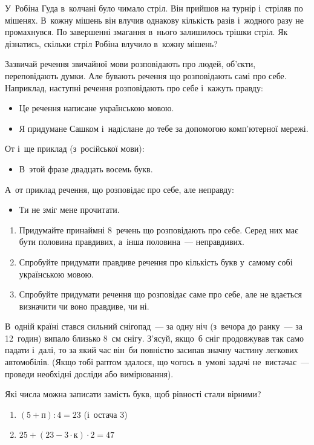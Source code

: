 \problem
У~Робіна Гуда в~колчані було чимало стріл.
Він прийшов на турнір і~стріляв по мішенях.
В~кожну мішень він влучив однакову кількість разів
і~жодного разу не промахнувся.
По завершенні змагання в~нього залишилось трішки стріл.
Як дізнатись, скільки стріл Робіна влучило в~кожну мішень?


\problem
Зазвичай речення звичайної мови розповідають про людей, об'єкти,
переповідають думки.
Але бувають речення що розповідають самі про себе.
Наприклад, наступні речення розповідають про себе і~кажуть правду:
\begin{itemize}
    \item Це речення написане українською мовою.
    \item Я придумане Сашком і~надіслане до тебе
    за допомогою комп’ютерної мережі.
\end{itemize}
От і~ще приклад (з~російської мови):
\begin{itemize}
    \item В~этой фразе двадцать восемь букв.
\end{itemize}
А~от приклад речення, що розповідає про себе, але неправду:
\begin{itemize}
    \item Ти не зміг мене прочитати.
\end{itemize}

\begin{enumerate}
    \item Придумайте принаймні 8~речень що розповідають про себе.
    Серед них має бути половина правдивих, а~інша половина~--- неправдивих.
    \item Спробуйте придумати правдиве речення про кількість букв
    у~самому собі українською мовою. 
    \item Спробуйте придумати речення що розповідає саме про себе,
    але не вдається визначити чи воно правдиве, чи ні.
\end{enumerate}


\problem
В~одній країні стався сильний снігопад~--- за одну ніч
(з~вечора до ранку~--- за 12~годин) випало близько 8~см снігу.
З'ясуй, якщо~б сніг продовжував так само падати і~далі,
то за який час він~би повністю засипав значну частину легкових автомобілів.
(Якщо тобі раптом здалося, що чогось в~умові задачі не~вистачає~---
проведи необхідні досліди або вимірювання).


\problem
Які числа можна записати замість букв, щоб рівності стали вірними?
\begin{enumerate}
    \item $(5 + \textit{п}) : 4 = 23$ (і~остача 3)
    \item $25 + (23 - 3 \cdot \textit{к}) \cdot 2 = 47$
\end{enumerate}


